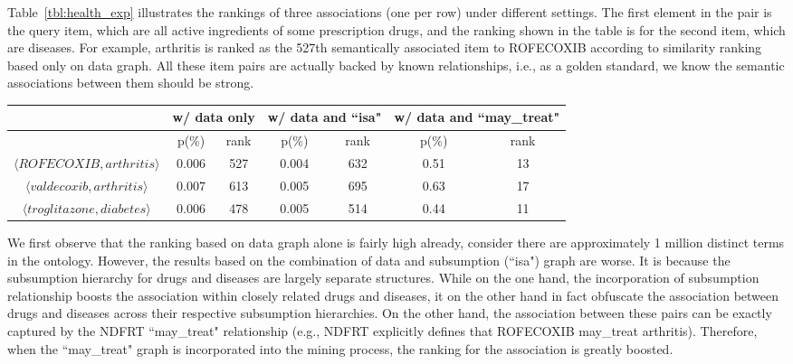 Table~\ref{tbl:health_exp} illustrates the rankings of three associations (one per row) under different settings. The first element in the pair is the query item, which are all active ingredients of some prescription drugs, and the ranking shown in the table is for the second item, which are diseases. For example, arthritis is ranked as the 527th semantically associated item to ROFECOXIB according to similarity ranking based only on data graph. All these item pairs are actually backed by known relationships, i.e., as a golden standard, we know the semantic associations between them should be strong.


\begin{table*}[tbh]\scriptsize
\begin{center}
\begin{tabular}{ c || c  c || c  c || c  c }
\hline
        &   \multicolumn{2}{c||}{w/ data only}  &   \multicolumn{2}{c||}{w/ data and ``isa"} & \multicolumn{2}{c}{w/ data and ``may\_treat"}\\
\hline
                        	&   p(\%)   &   rank    &   p(\%)    &   rank    &   p(\%)    &    rank    \\
\hline
$\langle ROFECOXIB, arthritis\rangle$  &   0.006   &   527     &   0.004    &   632     &   0.51     &     13     \\
$\langle valdecoxib, arthritis\rangle$  &   0.007   &   613     &   0.005    &   695     &   0.63     &     17     \\
$\langle troglitazone, diabetes\rangle$  &   0.006   &   478     &   0.005    &   514     &   0.44     &     11     \\
\hline
\end{tabular}
\end{center}
\caption{\label{tbl:health_exp}Rankings of three semantic associations in health data under different settings.}
\end{table*}

We first observe that the ranking based on data graph alone is fairly high already, consider there are approximately 1 million distinct terms in the ontology. However, the results based on the combination of data and subsumption (``isa") graph are worse. It is because the subsumption hierarchy for drugs and diseases are largely separate structures. While on the one hand, the incorporation of subsumption relationship boosts the association within closely related drugs and diseases, it on the other hand in fact obfuscate the association between drugs and diseases across their respective subsumption hierarchies. On the other hand, the association between these pairs can be exactly captured by the NDFRT ``may\_treat" relationship (e.g., NDFRT explicitly defines that ROFECOXIB may\_treat arthritis). Therefore, when the ``may\_treat" graph is incorporated into the mining process, the ranking for the association is greatly boosted.

